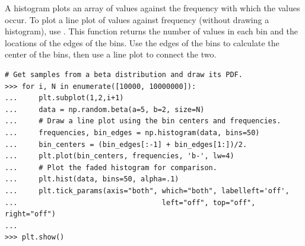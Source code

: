 A histogram plots an array of values against the frequency with which the values occur.
To plot a line plot of values against frequency (without drawing a histogram), use .
This function returns the number of values in each bin and the locations of the edges of the bins.
Use the edges of the bins to calculate the center of the bins, then use a line plot to connect the two.

\begin{lstlisting}
# Get samples from a beta distribution and draw its PDF.
>>> for i, N in enumerate([10000, 10000000]):
...     plt.subplot(1,2,i+1)
...     data = np.random.beta(a=5, b=2, size=N)
...     # Draw a line plot using the bin centers and frequencies.
...     frequencies, bin_edges = np.histogram(data, bins=50)
...     bin_centers = (bin_edges[:-1] + bin_edges[1:])/2.
...     plt.plot(bin_centers, frequencies, 'b-', lw=4)
...     # Plot the faded histogram for comparison.
...     plt.hist(data, bins=50, alpha=.1)
...     plt.tick_params(axis="both", which="both", labelleft='off',
...                                  left="off", top="off", right="off")
...
>>> plt.show()
\end{lstlisting}

